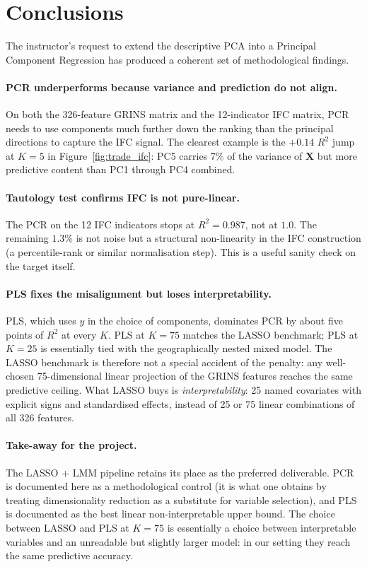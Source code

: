 \documentclass[11pt,a4paper]{article}
\begin{document}
\section{Conclusions}

The instructor's request to extend the descriptive PCA into a
Principal Component Regression has produced a coherent set of
methodological findings.

\paragraph{PCR underperforms because variance and prediction do not align.}
On both the 326-feature GRINS matrix and the 12-indicator IFC
matrix, PCR needs to use components much further down the ranking
than the principal directions to capture the IFC signal. The clearest
example is the \(+0.14\) \(R^{2}\) jump at \(K = 5\) in
Figure~\ref{fig:trade_ifc}: PC5 carries 7\% of the variance of
\(\mathbf{X}\) but more predictive content than PC1 through PC4
combined.

\paragraph{Tautology test confirms IFC is not pure-linear.}
The PCR on the 12 IFC indicators stops at \(R^{2} = 0.987\), not
at \(1.0\). The remaining \(1.3\%\) is not noise but a structural
non-linearity in the IFC construction (a percentile-rank or
similar normalisation step). This is a useful sanity check on the
target itself.

\paragraph{PLS fixes the misalignment but loses interpretability.}
PLS, which uses \(y\) in the choice of components, dominates PCR
by about five points of \(R^{2}\) at every \(K\). PLS at
\(K = 75\) matches the LASSO benchmark; PLS at \(K = 25\) is
essentially tied with the geographically nested mixed model. The
LASSO benchmark is therefore not a special accident of the
penalty: any well-chosen 75-dimensional linear projection of the
GRINS features reaches the same predictive ceiling. What LASSO
buys is \emph{interpretability}: 25 named covariates with
explicit signs and standardised effects, instead of 25 or 75
linear combinations of all 326 features.

\paragraph{Take-away for the project.}
The LASSO + LMM pipeline retains its place as the preferred
deliverable. PCR is documented here as a methodological control
(it is what one obtains by treating dimensionality reduction as a
substitute for variable selection), and PLS is documented as the
best linear non-interpretable upper bound. The choice between
LASSO and PLS at \(K = 75\) is essentially a choice between
interpretable variables and an unreadable but slightly larger
model: in our setting they reach the same predictive accuracy.
\end{document}
